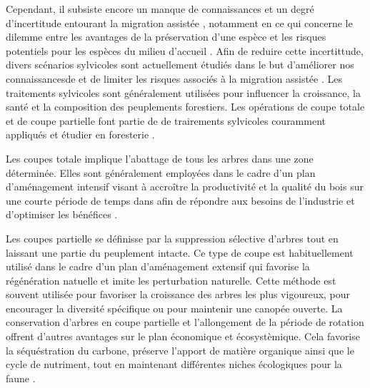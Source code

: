 Cependant, il subsiste encore un manque de connaissances et un degré d'incertitude entourant la migration assistée \citep{Park2018Informationunderload,Klenk2015assistedmigration}, 
notamment en ce qui concerne le dilemme entre les avantages de la préservation d'une espèce et les risques potentiels pour les espèces du milieu d'accueil \citep{Hewitt2011Takingstock,McLachlan2007frameworkdebate,Vitt2010Assistedmigration}.
Afin de reduire cette incertittude, divers scénarios sylvicoles sont actuellement étudiés dans le but d'améliorer nos connaissancesde et de limiter les risques associés à la migration assistée \citep{royoDesiredREgenerationAssisted2023}.
Les traitements sylvicoles sont généralement utilisées pour influencer la croissance, la santé et la composition des peuplements forestiers.
Les opérations de coupe totale et de coupe partielle font partie de de trairements sylvicoles couramment appliqués et étudier en foresterie \citep{Ameray2021Forestcarbon,Chaudhary2016Impactforest,Man2008Elevenyearresponses,MontoroGirona2018ConiferRegeneration,Pamerleau-Couture2015Effectthree}.

Les coupes totale implique l'abattage de tous les arbres dans une zone déterminée.
Elles sont généralement employées dans le cadre d'un plan d'aménagement intensif visant à accroître la productivité et la qualité du bois 
sur une courte période de temps dans afin de répondre aux besoins de l'industrie et d'optimiser les bénéfices \citep{Ameray2021ForestCarbon}.

Les coupes partielle se définisse par la suppression sélective d'arbres tout en laissant une partie du peuplement intacte. 
Ce type de coupe est habituellement utilisé dans le cadre d'un plan d'aménagement extensif qui favorise la régénération natuelle et imite les perturbation naturelle.
Cette méthode est souvent utilisée pour favoriser la croissance des arbres les plus vigoureux, pour encourager la diversité spécifique ou pour maintenir une canopée ouverte\citep{Ameray2021ForestCarbon,Irland2011TimberProductivity}.
La conservation d'arbres  en coupe partielle et l'allongement de la période de rotation offrent d'autres avantages sur le plan économique et écosystèmique. 
Cela favorise la séquéstration du carbone, préserve l'apport de matière organique ainsi que le cycle de nutriment, 
tout en maintenant différentes niches écologiques pour la faune \citep{Ameray2021ForestCarbon,Barg1999Influencepartial,Tong2020Forestmanagement}.

